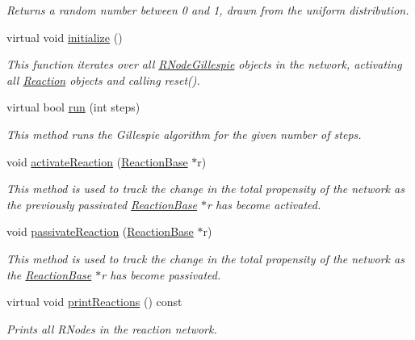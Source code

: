\begin{DoxyCompactItemize}
\begin{DoxyCompactList}\small\item\em Returns a random number between 0 and 1, drawn from the uniform distribution. \end{DoxyCompactList}\item 
virtual void \hyperlink{classChemGillespieImpl_a4362f0c7944ab1f6b07d43a2efbe8951}{initialize} ()
\begin{DoxyCompactList}\small\item\em This function iterates over all \hyperlink{classRNodeGillespie}{R\+Node\+Gillespie} objects in the network, activating all \hyperlink{classReaction}{Reaction} objects and calling reset(). \end{DoxyCompactList}\item 
virtual bool \hyperlink{classChemGillespieImpl_a1db4057b9cc7f51c2c8e3d880349f8a3}{run} (int steps)
\begin{DoxyCompactList}\small\item\em This method runs the Gillespie algorithm for the given number of steps. \end{DoxyCompactList}\item 
void \hyperlink{classChemGillespieImpl_aefbeeeb2edf0d6726cf50c129e320e58}{activate\+Reaction} (\hyperlink{classReactionBase}{Reaction\+Base} $\ast$r)
\begin{DoxyCompactList}\small\item\em This method is used to track the change in the total propensity of the network as the previously passivated \hyperlink{classReactionBase}{Reaction\+Base} $\ast$r has become activated. \end{DoxyCompactList}\item 
void \hyperlink{classChemGillespieImpl_a5916a11b71b642edee290af9fc969b28}{passivate\+Reaction} (\hyperlink{classReactionBase}{Reaction\+Base} $\ast$r)
\begin{DoxyCompactList}\small\item\em This method is used to track the change in the total propensity of the network as the \hyperlink{classReactionBase}{Reaction\+Base} $\ast$r has become passivated. \end{DoxyCompactList}\item 
virtual void \hyperlink{classChemGillespieImpl_a389502576c64b5c4454a79c4b6ccd4b2}{print\+Reactions} () const 
\begin{DoxyCompactList}\small\item\em Prints all R\+Nodes in the reaction network. \end{DoxyCompactList}\end{DoxyCompactItemize}
